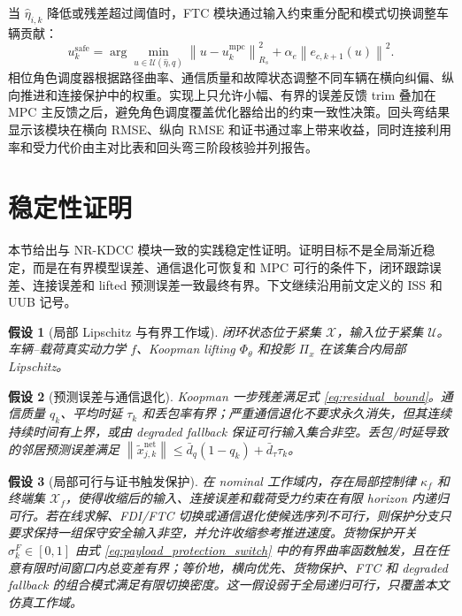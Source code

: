 \documentclass[twocolumn,3p,times,procedia]{elsarticle}
\newcommand{\Method}{NR-KDCC}
\newcommand{\norm}[1]{\left\lVert #1 \right\rVert}
\newtheorem{assumption}{假设}
\begin{document}
当 $\hat\eta_{i,k}$ 降低或残差超过阈值时，FTC 模块通过输入约束重分配和模式切换调整车辆贡献：
\begin{equation}
u_k^\mathrm{safe}=\arg\min_{u\in\mathcal U(\hat\eta,q)}
\norm{u-u_k^\mathrm{mpc}}_{R_s}^2+
\alpha_e\norm{e_{c,k+1}(u)}^2 .
\label{eq:ftc_projection}
\end{equation}
相位角色调度器根据路径曲率、通信质量和故障状态调整不同车辆在横向纠偏、纵向推进和连接保护中的权重。实现上只允许小幅、有界的误差反馈 trim 叠加在 MPC 主反馈之后，避免角色调度覆盖优化器给出的约束一致性决策。回头弯结果显示该模块在横向 RMSE、纵向 RMSE 和证书通过率上带来收益，同时连接利用率和受力代价由主对比表和回头弯三阶段核验并列报告。

\section{稳定性证明}

本节给出与 \Method{} 模块一致的实践稳定性证明。证明目标不是全局渐近稳定，而是在有界模型误差、通信退化可恢复和 MPC 可行的条件下，闭环跟踪误差、连接误差和 lifted 预测误差一致最终有界。下文继续沿用前文定义的 ISS 和 UUB 记号。

\begin{assumption}[局部 Lipschitz 与有界工作域]
闭环状态位于紧集 $\mathcal X$，输入位于紧集 $\mathcal U$。车辆--载荷真实动力学 $f$、Koopman lifting $\Phi_\theta$ 和投影 $\Pi_x$ 在该集合内局部 Lipschitz。
\end{assumption}

\begin{assumption}[预测误差与通信退化]
Koopman 一步残差满足式 \eqref{eq:residual_bound}。通信质量 $q_k$、平均时延 $\tau_k$ 和丢包率有界；严重通信退化不要求永久消失，但其连续持续时间有上界，或由 degraded fallback 保证可行输入集合非空。丢包/时延导致的邻居预测误差满足 $\norm{\tilde x_{j,k}^{\mathrm{net}}}\le \bar d_q(1-q_k)+\bar d_\tau \tau_k$。
\end{assumption}

\begin{assumption}[局部可行与证书触发保护]
在 nominal 工作域内，存在局部控制律 $\kappa_f$ 和终端集 $\mathcal X_f$，使得收缩后的输入、连接误差和载荷受力约束在有限 horizon 内递归可行。若在线求解、FDI/FTC 切换或通信退化使候选序列不可行，则保护分支只要求保持一组保守安全输入非空，并允许收缩参考推进速度。货物保护开关 $\sigma_k^F\in[0,1]$ 由式 \eqref{eq:payload_protection_switch} 中的有界曲率函数触发，且在任意有限时间窗口内总变差有界；等价地，横向优先、货物保护、FTC 和 degraded fallback 的组合模式满足有限切换密度。这一假设弱于全局递归可行，只覆盖本文仿真工作域。
\end{assumption}
\end{document}
